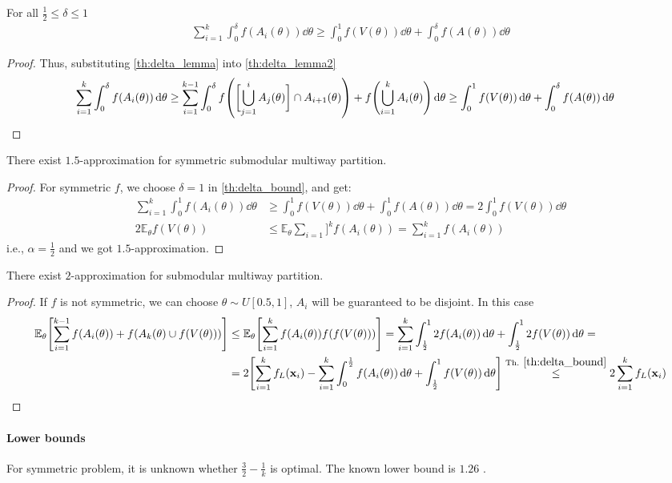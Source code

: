 \begin{theorem} \label{th:delta_bound}
	For all $\frac{1}{2} \leq \delta \leq 1$
	\begin{align}
	\sum_{i=1}^k \int_0^\delta f(A_i(\theta)) \dd{\theta} \geq \int_0^1 f(V(\theta)) \dd{\theta} + \int_0^\delta f(A(\theta))\dd{\theta}
	\end{align}
	\begin{proof}
		Thus, substituting \vref{th:delta_lemma} into \vref{th:delta_lemma2}
		\begin{align}
		\sum_{i=1}^k \int_0^\delta f(A_i(\theta)) \dd{\theta} &\geq \sum_{i=1}^{k-1} \int_0^\delta f\qty(\qty\bigg[ \bigcup_{j=1}^{i} A_j(\theta)] \cap A_{i+1}(\theta))  +  f\qty(\bigcup_{i=1}^k A_i(\theta) )\dd{\theta}  \geq \int_0^1 f(V(\theta)) \dd{\theta} + \int_0^\delta f\qty(A(\theta) ) \dd{\theta}
		\end{align}
	\end{proof}
\end{theorem}
\begin{theorem}
	There exist $1.5$-approximation for symmetric submodular multiway partition.
	\begin{proof}
	For symmetric $f$, we choose $\delta = 1$ in \cref{th:delta_bound}, and get:
	\begin{align}
	\sum_{i=1}^k \int_0^1 f(A_i(\theta)) \dd{\theta} &\geq \int_0^1 f(V(\theta)) \dd{\theta} + \int_0^1 f(A(\theta))\dd{\theta} = 2\int_0^1 f(V(\theta)) \dd{\theta}\\ 
	2\mathbb{E}_\theta f(V(\theta)) &\leq  \mathbb{E}_\theta  \sum_{i=1}]^k  f(A_i(\theta)) =  \sum_{i=1}^{k} f(A_i(\theta))  
	\end{align}
	i.e., $\alpha = \frac{1}{2}$ and we got $1.5$-approximation.
	\end{proof}
\end{theorem}

\begin{theorem}
	There exist $2$-approximation for submodular multiway partition.
		\begin{proof}
If $f$ is not symmetric, we can choose $\theta\sim U[0.5,1]$, $A_i$ will be guaranteed to be disjoint. In this case
\begin{align}
\mathbb{E}_\theta \qty[\sum_{i=1}^{k-1} f(A_i(\theta)) + f(A_k(\theta) \cup f(V(\theta))) ] &\leq\mathbb{E}_\theta \qty[\sum_{i=1}^{k} f(A_i(\theta))  f(f(V(\theta))) ] = \sum_{i=1}^k \int_{\frac{1}{2}}^{1} 2 f(A_i(\theta))\dd{\theta} + \int_{\frac{1}{2}}^{1} 2 f(V(\theta)) \dd{\theta}  =\\&=
 2\qty[\sum_{i=1}^k f_L(\vb{x}_i) - \sum_{i=1}^k \int_0^{\frac{1}{2}}  f(A_i(\theta))\dd{\theta} + \int_{\frac{1}{2}}^{1}  f(V(\theta)) \dd{\theta}] \stackrel{\text{Th. }\ref{th:delta_bound}}{\leq} 2 \sum_{i=1}^k f_L(\vb{x}_i)
\end{align}	\end{proof}
\end{theorem}

\paragraph{Lower bounds} For symmetric problem, it is unknown whether $\frac{3}{2} - \frac{1}{k}$ is optimal. The known lower bound is $1.26$ \cite{ene2013local}.

